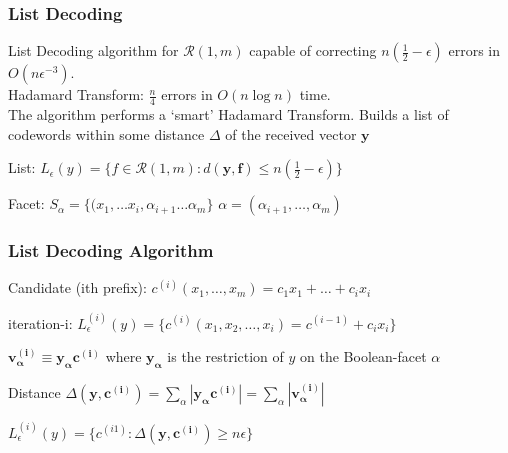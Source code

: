 \documentclass[xcolor=xvgnames]{beamer}
\newcommand{\RM}[2]{\ensuremath{\mathcal{R}(#1,#2)}}
\newcommand{\V}[1]{\ensuremath{\mathbf{#1}}}
\begin{document}

\begin{frame}
\frametitle{List Decoding}

List Decoding algorithm for $\RM{1}{m}$ capable of correcting $n(\frac{1}{2} - \epsilon)$ errors in $O(n \epsilon^{-3})$. \\
Hadamard Transform: $\frac{n}{4}$ errors in $O(n\log{n})$ time. \\

The algorithm performs a `smart' Hadamard Transform.
Builds a list of codewords within some distance $\Delta$ of the
received vector $\V{y}$

\alert{List:} $L_{\epsilon}(y) = \{f \in \RM{1}{m} : d(\V{y}, \V{f} ) \leq n(\frac{1}{2} - \epsilon) \} $ 

\alert{Facet:} $S_\alpha = \{(x_1,\ldots x_i, \alpha_{i+1}\ldots \alpha_{m} \}$ \quad $ \alpha=(\alpha_{i+1}, \ldots ,\alpha_m)$ 

 \end{frame}



\begin{frame}
  \frametitle{List Decoding Algorithm}

\alert{Candidate (ith prefix)}: $c^{(i)} (x_1 ,\ldots, x_m) = c_1x_1 + \ldots + c_ix_i$ 

\alert{iteration-i: } $ L_{\epsilon}^{(i)} (y) = \{c^{(i)}(x_1,x_2,\ldots,x_i) = c^{(i-1)}+c_ix_i\}$ 

$\V{v_\alpha^{(i)}} \equiv \V{y_\alpha}\V{c^{(i)}}$ where
$\V{y_\alpha}$ is the restriction of $y$ on the Boolean-facet $\alpha$

\begin{block}{Distance}
 $\Delta(\V{y},\V{c^{(i)}}) = \sum_\alpha|\V{y_\alpha}\V{c^{(i)}}| = \sum_\alpha|\V{v_\alpha^{(i)}}|$
\end{block}

\begin{block}
$ L_{\epsilon}^{(i)} (y) = \{c^{(i1)} : \Delta(\V{y},\V{c^{(i)}}) \geq n\epsilon \} $
\end{block}

\end{frame}

\end{document}
